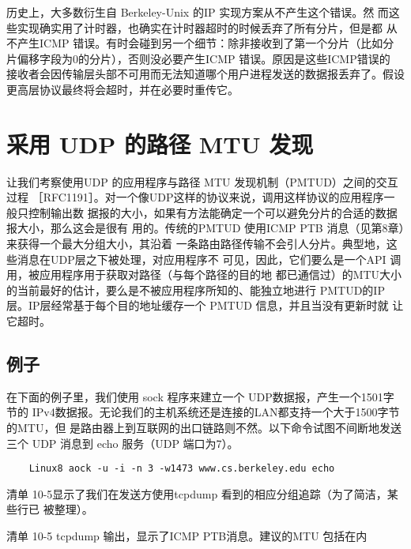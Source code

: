 \begin{tcolorbox}    
    历史上，大多数衍生自 Berkeley-Unix 的IP 实现方案从不产生这个错误。然
    而这些实现确实用了计时器，也确实在计时器超时的时候丢弃了所有分片，但是都
    从不产生ICMP 错误。有时会碰到另一个细节：除非接收到了第一个分片（比如分
    片偏移字段为0的分片），否则没必要产生ICMP 错误。原因是这些ICMP错误的
    接收者会因传输层头部不可用而无法知道哪个用户进程发送的数据报丢弃了。假设
    更高层协议最终将会超时，并在必要时重传它。
\end{tcolorbox}

\section{采用 UDP 的路径 MTU 发现}

让我们考察使用UDP 的应用程序与路径 MTU 发现机制（PMTUD）之间的交互过程
［RFC1191］。对一个像UDP这样的协议来说，调用这样协议的应用程序一般只控制输出数
据报的大小，如果有方法能确定一个可以避免分片的合适的数据报大小，那么这会是很有
用的。传统的PMTUD 使用ICMP PTB 消息（见第8章）来获得一个最大分组大小，其沿着
一条路由路径传输不会引人分片。典型地，这些消息在UDP层之下被处理，对应用程序不
可见，因此，它们要么是一个API 调用，被应用程序用于获取对路径（与每个路径的目的地
都已通信过）的MTU大小的当前最好的估计，要么是不被应用程序所知的、能独立地进行
PMTUD的IP层。IP层经常基于每个目的地址缓存一个 PMTUD 信息，并且当没有更新时就
让它超时。

\subsection{例子}
在下面的例子里，我们使用 sock 程序来建立一个 UDP数据报，产生一个1501字节的
IPv4数据报。无论我们的主机系统还是连接的LAN都支持一个大于1500字节的MTU，但
是路由器上到互联网的出口链路则不然。以下命令试图不间断地发送三个 UDP 消息到 echo
服务（UDP 端口为7）。

\begin{verbatim}
    Linux8 aock -u -i -n 3 -w1473 www.cs.berkeley.edu echo
\end{verbatim}

清单 10-5显示了我们在发送方使用tcpdump 看到的相应分组追踪（为了简洁，某些行已
被整理）。

清单 10-5 tcpdump 输出，显示了ICMP PTB消息。建议的MTU 包括在内

